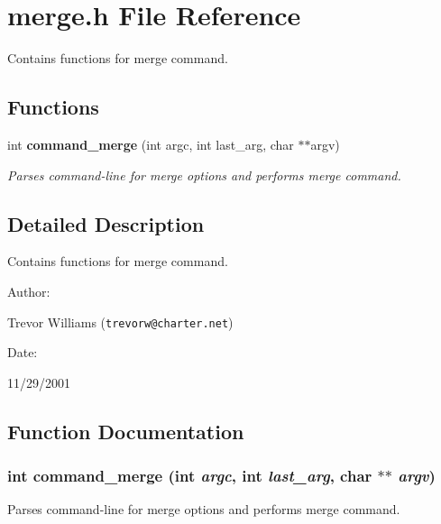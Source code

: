 \section{merge.h File Reference}
\label{merge_8h}
Contains functions for merge command. 


\subsection*{Functions}
\begin{CompactItemize}
\item 
int {\bf command\_\-merge} (int argc, int last\_\-arg, char $\ast$$\ast$argv)
\begin{CompactList}\small\item\em Parses command-line for merge options and performs merge command.\item\end{CompactList}\end{CompactItemize}


\subsection{Detailed Description}
Contains functions for merge command.



\begin{Desc}
\item[Author: ]\par
Trevor Williams ({\tt trevorw@charter.net}) \end{Desc}
\begin{Desc}
\item[Date: ]\par
11/29/2001\end{Desc}


\subsection{Function Documentation}
\subsubsection{\setlength{\rightskip}{0pt plus 5cm}int command\_\-merge (int {\em argc}, int {\em last\_\-arg}, char $\ast$$\ast$ {\em argv})}\label{merge_8h_a0}


Parses command-line for merge options and performs merge command.

